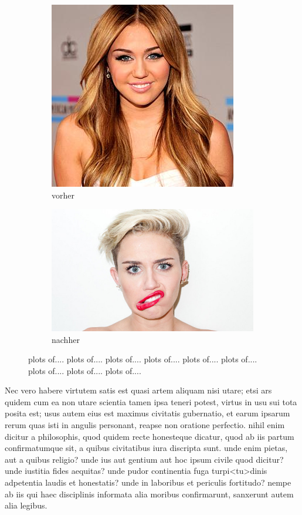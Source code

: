 \begin{figure}[h]
\begin{subfigure}{.5\textwidth}
  \centering
  \includegraphics[width=.8\linewidth]{Graphics/vorher}
  \caption{vorher}
  \label{fig:fig1.1}
\end{subfigure}%
\begin{subfigure}{.5\textwidth}
  \centering
  \includegraphics[width=.8\linewidth]{Graphics/nachher}
  \caption{nachher}
  \label{fig:fig1.2}
\end{subfigure}
\captionsetup{justification=raggedright,singlelinecheck=false}
\caption{plots of.... plots of.... plots of.... plots of.... plots of.... plots of.... plots of.... plots of.... plots of....}
\label{fig:fig}
\end{figure}
Nec vero habere virtutem satis est quasi artem aliquam nisi utare; etsi ars quidem cum ea non utare scientia tamen ipsa teneri potest, virtus in usu sui tota posita est; usus autem eius est maximus civitatis gubernatio, et earum ipsarum rerum quas isti in angulis personant, reapse non oratione perfectio. nihil enim dicitur a philosophis, quod quidem recte honesteque dicatur, quod ab iis partum confirmatumque sit, a quibus civitatibus iura discripta sunt. unde enim pietas, aut a quibus religio? unde ius aut gentium aut hoc ipsum civile quod dicitur? unde iustitia fides aequitas? unde pudor continentia fuga turpi<tu>dinis adpetentia laudis et honestatis? unde in laboribus et periculis fortitudo? nempe ab iis qui haec disciplinis informata alia moribus confirmarunt, sanxerunt autem alia legibus. 


